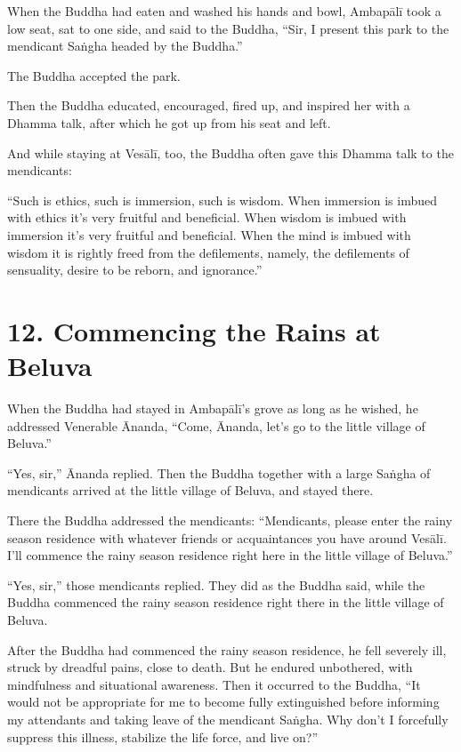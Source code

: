 \documentclass[12pt,openany]{book}%
\begin{document}
When the Buddha had eaten and washed his hands and bowl, \textsanskrit{Ambapālī} took a low seat, sat to one side, and said to the Buddha, “Sir, I present this park to the mendicant \textsanskrit{Saṅgha} headed by the Buddha.” 

The Buddha accepted the park. 

Then the Buddha educated, encouraged, fired up, and inspired her with a Dhamma talk, after which he got up from his seat and left. 

And while staying at \textsanskrit{Vesālī}, too, the Buddha often gave this Dhamma talk to the mendicants: 

“Such is ethics, such is immersion, such is wisdom. When immersion is imbued with ethics it’s very fruitful and beneficial. When wisdom is imbued with immersion it’s very fruitful and beneficial. When the mind is imbued with wisdom it is rightly freed from the defilements, namely, the defilements of sensuality, desire to be reborn, and ignorance.” 

\section*{12. Commencing the Rains at Beluva }

When the Buddha had stayed in \textsanskrit{Ambapālī}’s grove as long as he wished, he addressed Venerable Ānanda, “Come, Ānanda, let’s go to the little village of Beluva.” 

“Yes, sir,” Ānanda replied. Then the Buddha together with a large \textsanskrit{Saṅgha} of mendicants arrived at the little village of Beluva, and stayed there. 

There the Buddha addressed the mendicants: “Mendicants, please enter the rainy season residence with whatever friends or acquaintances you have around \textsanskrit{Vesālī}. I’ll commence the rainy season residence right here in the little village of Beluva.” 

“Yes, sir,” those mendicants replied. They did as the Buddha said, while the Buddha commenced the rainy season residence right there in the little village of Beluva. 

After the Buddha had commenced the rainy season residence, he fell severely ill, struck by dreadful pains, close to death. But he endured unbothered, with mindfulness and situational awareness. Then it occurred to the Buddha, “It would not be appropriate for me to become fully extinguished before informing my attendants and taking leave of the mendicant \textsanskrit{Saṅgha}. Why don’t I forcefully suppress this illness, stabilize the life force, and live on?” 
\end{document}
